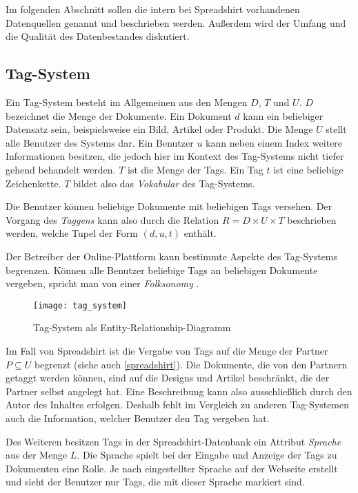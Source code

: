 Im folgenden Abschnitt sollen die intern bei Spreadshirt vorhandenen Datenquellen genannt und beschrieben werden. Außerdem wird der Umfang und die Qualität des Datenbestandes diskutiert.

\subsection{Tag-System}
\label{tag-system}

Ein Tag-System besteht im Allgemeinen aus den Mengen \(D\), \(T\) und \(U\). \(D\) bezeichnet die Menge der Dokumente. Ein Dokument \(d\) kann ein beliebiger Datensatz sein, beispielsweise ein Bild, Artikel oder Produkt. Die Menge \(U\) stellt alle Benutzer des Systems dar. Ein Benutzer \(u\) kann neben einem Index weitere Informationen besitzen, die jedoch hier im Kontext des Tag-Systems nicht tiefer gehend behandelt werden. \(T\) ist die Menge der Tags. Ein Tag \(t\) ist eine beliebige Zeichenkette. \(T\) bildet also das \emph{Vokabular} des Tag-Systems.

Die Benutzer können beliebige Dokumente mit beliebigen Tags versehen. Der Vorgang des \emph{Taggens} kann also durch die Relation \(R = D \times U \times T\) beschrieben werden, welche Tupel der Form \((d, u, t)\) enthält.

Der Betreiber der Online-Plattform kann bestimmte Aspekte des Tag-Systems begrenzen. Können alle Benutzer beliebige Tags an beliebigen Dokumente vergeben, spricht man von einer \emph{Folksonomy} \cite{ip2009}.

\begin{figure}
\label{fig:tagsystem}
\begin{center}
    \texttt{[image: tag\_system]}
\end{center}
\caption{Tag-System als Entity-Relationship-Diagramm}
\end{figure}


Im Fall von Spreadshirt ist die Vergabe von Tags auf die Menge der Partner \(P \subseteq U\) begrenzt (siehe auch \ref{spreadshirt}). Die Dokumente, die von den Partnern getaggt werden können, sind auf die Designs und Artikel beschränkt, die der Partner selbst angelegt hat. Eine Beschreibung kann also ausschließlich durch den Autor des Inhaltes erfolgen. Deshalb fehlt im Vergleich zu anderen Tag-Systemen auch die Information, welcher Benutzer den Tag vergeben hat.

Des Weiteren besitzen Tags in der Spreadshirt-Datenbank ein Attribut \emph{Sprache} aus der Menge \(L\). Die Sprache spielt bei der Eingabe und Anzeige der Tags zu Dokumenten eine Rolle. Je nach eingestellter Sprache auf der Webseite erstellt und sieht der Benutzer nur Tags, die mit dieser Sprache markiert sind.

